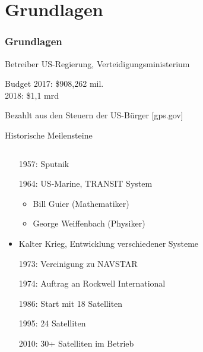 \section{Grundlagen}
\begin{frame}
       \frametitle{Grundlagen}
       \begin{block}{Betreiber}
           US-Regierung, Verteidigungsministerium
       \end{block}
       \begin{block}{Budget}
           2017: \$908,262 mil.\\
           2018: \$1,1 mrd
       \end{block}
       Bezahlt aus den Steuern der US-Bürger
       {\small [gps.gov]}
   \end{frame}

   \begin{frame}{Historische Meilensteine}
       \begin{columns}
           \begin{column}{0.5\textwidth}
               \begin{itemize}
                   \item[1957:] Sputnik
                   \item[1964:] US-Marine, TRANSIT System
                   \begin{itemize}
                       \item Bill Guier (Mathematiker)
                       \item George Weiffenbach (Physiker)
                   \end{itemize}
                   \item Kalter Krieg, Entwicklung verschiedener Systeme
                   \item[1973:] Vereinigung zu NAVSTAR
                   \item[1974:] Auftrag an Rockwell International
                   \item[1986:] Start mit 18 Satelliten
                   \item[1995:] 24 Satelliten
                   \item[2010:] 30+ Satelliten im Betrieb
               \end{itemize}
           \end{column}
           \begin{column}{0.35\textwidth}
               \begin{figure}

\end{figure}
\end{column}
\end{columns}
\end{frame}
